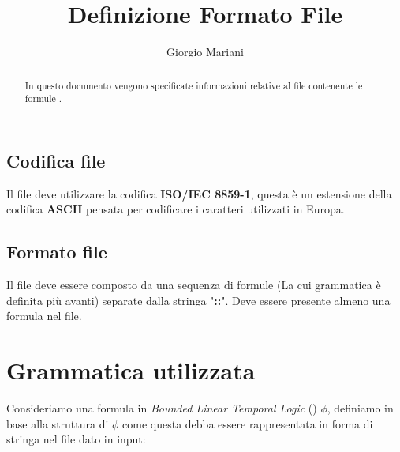 \documentclass[10pt,a4paper]{article}
\author{Giorgio Mariani}
\date{}
\title{Definizione Formato File}
\begin{document}
	\maketitle
	\begin{abstract}
		In questo documento vengono specificate informazioni relative al file contenente le formule \BLTL{}.
	\end{abstract}
	 \begin{paracol}{2}
		\subsection*{Codifica file}
		Il file deve utilizzare la codifica \textbf{ISO/IEC 8859-1}, questa è un estensione della codifica \textbf{ASCII} pensata per codificare i caratteri utilizzati in Europa.
		
		\switchcolumn
		
		\subsection*{Formato file}
		Il file deve essere composto da una sequenza di formule \BLTL{} (La cui grammatica è definita più avanti) separate dalla stringa "\textbf{::}". Deve essere presente almeno una formula nel file. 
	\end{paracol}
	
	\section{Grammatica utilizzata}
	Consideriamo una formula in \emph{Bounded Linear Temporal Logic} (\BLTL{}) $\phi$, definiamo in base alla struttura di $\phi$ come questa debba essere rappresentata in forma di stringa nel file dato in input:
	
\end{document}
